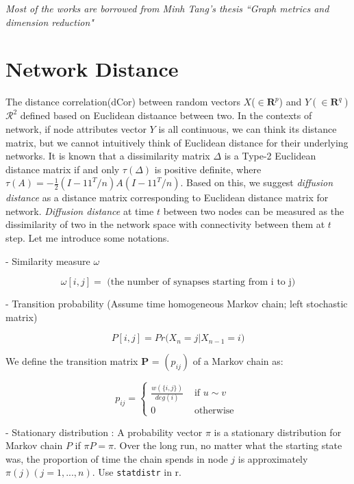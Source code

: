 \documentclass[12pt]{report}
\begin{document}






\doublespace


\sffamily
\normalsize
\textit{Most of the works are borrowed from Minh Tang's thesis ``Graph metrics and dimension reduction"}

\section{Network Distance}

 The distance correlation(dCor) between random vectors $X$($\in \textbf{R}^{p}$) and $Y(\in \textbf{R}^{q})$ $\mathcal{R}^2$ defined based on Euclidean distaance between two. In the contexts of network, if node attributes vector $Y$ is all continuous, we can think its distance matrix, but we cannot intuitively think of Euclidean distance for their underlying networks. It is known that a dissimilarity matrix $\Delta$ is a Type-2 Euclidean distance matrix if and only $\tau(\Delta)$ is positive definite, where $\tau(A) = -\frac{1}{2}(I - 1 1^{T} / n) A (I - 1 1^{T} / n).$ Based on this, we suggest \textit{diffusion distance} as a distance matrix corresponding to Euclidean distance matrix for network. \textit{Diffusion distance} at time $t$ between two nodes can be measured as the dissimilarity of two in the network space with connectivity between them at $t$ step. Let me introduce some notations. 
 
 - Similarity measure $\omega$

$$\omega[i,j] = \mbox{ (the number of synapses starting from i to j)}$$
 

- Transition probability (Assume time homogeneous Markov chain; left stochastic matrix)

$$P[i,j] = Pr\big( X_{n} = j  | X_{n-1} = i \big)$$

We define the transition matrix \textbf{P} = $(p_{ij})$ of a Markov chain as:

$$p_{ij} = \left\{ \begin{array}{ll} \frac{w(\{ i, j\})}{ deg(i) } & \mbox{ if } u \sim v \\ 0 & \mbox{ otherwise }  \end{array}  \right.$$

- Stationary distribution 
: A probability vector $\pi$ is a stationary distribution for Markov chain $P$ if $\pi P = \pi$. Over the long run, no matter what the starting state was, the proportion of time the chain spends in node $j$ is approximately $\pi(j) (j = 1, ... , n)$.
Use \verb!statdistr! in r.
  
\end{document}
